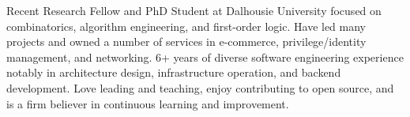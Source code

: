 
\begin{cvparagraph}
Recent Research Fellow and PhD Student at Dalhousie University focused on combinatorics, algorithm engineering, and first-order logic. Have led many projects and owned a number of services in e-commerce, privilege/identity management, and networking. 6+ years of diverse software engineering experience notably in architecture design, infrastructure operation, and backend development. Love leading and teaching, enjoy contributing to open source, and is a firm believer in continuous learning and improvement.
\end{cvparagraph}
